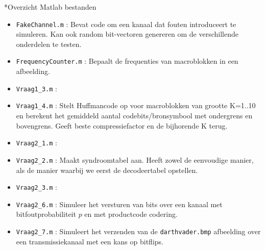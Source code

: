 \documentclass[]{article}
\begin{document}
\begin{section}*{Overzicht Matlab bestanden}
\begin{itemize}
    \item \texttt{FakeChannel.m} : Bevat code om een kanaal dat fouten
        introduceert te simuleren. Kan ook random bit-vectoren genereren
        om de verschillende onderdelen te testen.
    \item \texttt{FrequencyCounter.m} : Bepaalt de frequenties van
        macroblokken in een afbeelding.
    \item \texttt{Vraag1\_3.m} :
    \item \texttt{Vraag1\_4.m} : Stelt Huffmancode op voor macroblokken
        van grootte K=1..10 en berekent het gemiddeld aantal
        codebits/bronsymbool met ondergrens en bovengrens. Geeft beste
        compressiefactor en de bijhorende K terug.
    \item \texttt{Vraag2\_1.m} :
    \item \texttt{Vraag2\_2.m} : Maakt syndroomtabel aan. Heeft zowel
        de eenvoudige manier, als de manier waarbij we eerst de
        decodeertabel opstellen.
    \item \texttt{Vraag2\_3.m} :
    \item \texttt{Vraag2\_6.m} : Simuleer het versturen van bits over
        een kanaal met bitfoutprobabiliteit $p$ en met productcode
        codering.
    \item \texttt{Vraag2\_7.m} : Simuleert het verzenden van de
        \texttt{darthvader.bmp} afbeelding over een transmissiekanaal
        met een kans op bitflips.
\end{itemize}
\end{section}
\end{document}
